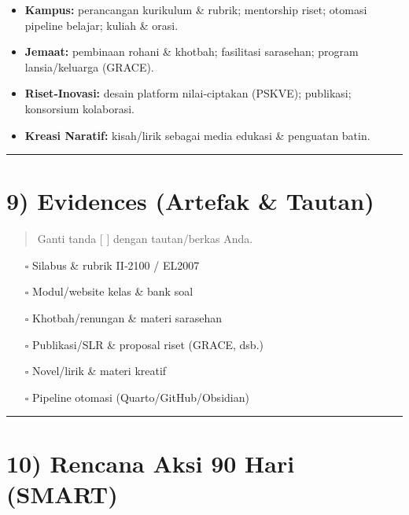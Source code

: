 \documentclass[
  letterpaper,
  DIV=11,
  numbers=noendperiod]{scrreprt}
\providecommand{\tightlist}{%
  \setlength{\itemsep}{0pt}\setlength{\parskip}{0pt}}\usepackage{longtable,booktabs,array}
\begin{document}
\begin{itemize}
\tightlist
\item
  \textbf{Kampus:} perancangan kurikulum \& rubrik; mentorship riset;
  otomasi pipeline belajar; kuliah \& orasi.
\item
  \textbf{Jemaat:} pembinaan rohani \& khotbah; fasilitasi sarasehan;
  program lansia/keluarga (GRACE).
\item
  \textbf{Riset‑Inovasi:} desain platform nilai‑ciptakan (PSKVE);
  publikasi; konsorsium kolaborasi.
\item
  \textbf{Kreasi Naratif:} kisah/lirik sebagai media edukasi \&
  penguatan batin.
\end{itemize}

\begin{center}\rule{0.5\linewidth}{0.5pt}\end{center}

\section{9) Evidences (Artefak \&
Tautan)}\label{evidences-artefak-tautan}

\begin{quote}
Ganti tanda {[} {]} dengan tautan/berkas Anda.
\end{quote}

\begin{itemize}
\tightlist
\item[$\square$]
  Silabus \& rubrik II‑2100 / EL2007
\item[$\square$]
  Modul/website kelas \& bank soal
\item[$\square$]
  Khotbah/renungan \& materi sarasehan
\item[$\square$]
  Publikasi/SLR \& proposal riset (GRACE, dsb.)
\item[$\square$]
  Novel/lirik \& materi kreatif
\item[$\square$]
  Pipeline otomasi (Quarto/GitHub/Obsidian)
\end{itemize}

\begin{center}\rule{0.5\linewidth}{0.5pt}\end{center}

\section{10) Rencana Aksi 90 Hari
(SMART)}\label{rencana-aksi-90-hari-smart}
\end{document}
